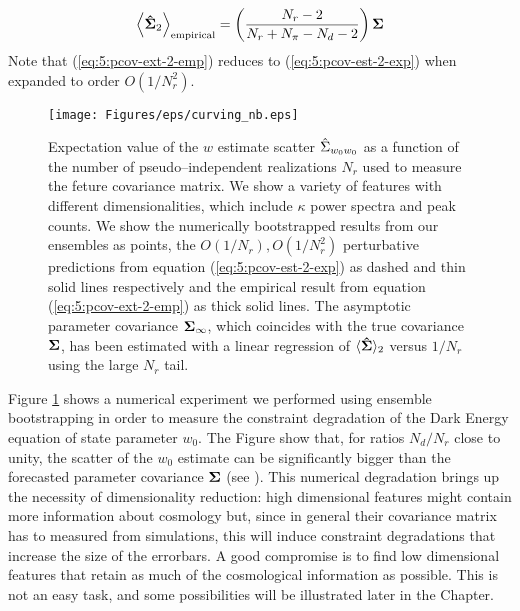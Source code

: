 \begin{equation}
\label{eq:5:pcov-ext-2-emp}
\left\langle\mathbf{\hat{\Sigma}}_2\right\rangle_{\rm empirical} = \left(\frac{N_r-2}{N_r+N_\pi-N_d-2}\right)\mathbf{\Sigma}
\end{equation}
%
Note that (\ref{eq:5:pcov-ext-2-emp}) reduces to (\ref{eq:5:pcov-est-2-exp}) when expanded to order $O(1/N_r^2)$. 
%
\begin{figure}
\begin{center}
\texttt{[image: Figures/eps/curving\_nb.eps]}
\end{center}
\caption{Expectation value of the $w$ estimate scatter $\hat{\Sigma}_{w_0w_0}$ as a function of the number of pseudo--independent realizations $N_r$ used to measure the feture covariance matrix. We show a variety of features with different dimensionalities, which include $\kappa$ power spectra and peak counts. We show the numerically bootstrapped results from our ensembles as points, the $O(1/N_r),O(1/N_r^2)$ perturbative predictions from equation (\ref{eq:5:pcov-est-2-exp}) as dashed and thin solid lines respectively and the empirical result from equation (\ref{eq:5:pcov-ext-2-emp}) as thick solid lines. The asymptotic parameter covariance $\mathbf{\Sigma}_\infty$, which coincides with the true covariance $\mathbf{\Sigma}$, has been estimated with a linear regression of $\langle\mathbf{\hat{\Sigma}}\rangle_2$ versus $1/N_r$ using the large $N_r$ tail.} 
\label{fig:5:curvenb}
\end{figure}
%
Figure \ref{fig:5:curvenb} shows a numerical experiment we performed using ensemble bootstrapping in order to measure the constraint degradation of the Dark Energy equation of state parameter $w_0$. The Figure show that, for ratios $N_d/N_r$ close to unity, the scatter of the $w_0$ estimate can be significantly bigger than the forecasted parameter covariance $\mathbf{\Sigma}$ (see \citep{DodelsonSchneider13,PetriVariance}). This numerical degradation brings up the necessity of dimensionality reduction: high dimensional features might contain more information about cosmology but, since in general their covariance matrix has to measured from simulations, this will induce constraint degradations that increase the size of the errorbars. A good compromise is to find low dimensional features that retain as much of the cosmological information as possible. This is not an easy task, and some possibilities will be illustrated later in the Chapter.  

